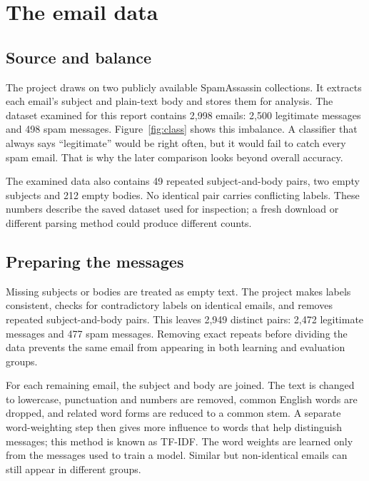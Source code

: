 \chapter{The email data}
\section{Source and balance}
The project draws on two publicly available SpamAssassin collections\cite{corpus}. It extracts each email's subject and plain-text body and stores them for analysis. The dataset examined for this report contains 2,998 emails: 2,500 legitimate messages and 498 spam messages. Figure~\ref{fig:class} shows this imbalance. A classifier that always says ``legitimate'' would be right often, but it would fail to catch every spam email. That is why the later comparison looks beyond overall accuracy.

The examined data also contains 49 repeated subject-and-body pairs, two empty subjects and 212 empty bodies. No identical pair carries conflicting labels. These numbers describe the saved dataset used for inspection; a fresh download or different parsing method could produce different counts.


\section{Preparing the messages}
Missing subjects or bodies are treated as empty text. The project makes labels consistent, checks for contradictory labels on identical emails, and removes repeated subject-and-body pairs. This leaves 2,949 distinct pairs: 2,472 legitimate messages and 477 spam messages. Removing exact repeats before dividing the data prevents the same email from appearing in both learning and evaluation groups.

For each remaining email, the subject and body are joined. The text is changed to lowercase, punctuation and numbers are removed, common English words are dropped, and related word forms are reduced to a common stem. A separate word-weighting step then gives more influence to words that help distinguish messages; this method is known as TF-IDF\cite{tfidf}. The word weights are learned only from the messages used to train a model\cite{pipeline}. Similar but non-identical emails can still appear in different groups.
